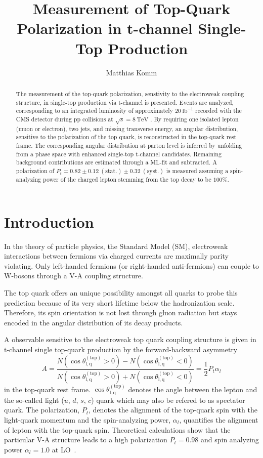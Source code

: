\documentclass[a4paper]{jpconf}
\newcommand{\unit}[1]{\ensuremath{\mathrm{~#1}}}
\newcommand{\particle}[1]{\ensuremath{#1}}
\newcommand{\costheta}[0]{\cos\theta_{\mathrm{l,q}}^{\mathrm{(top)}}}
\begin{document}
\title{Measurement of Top-Quark Polarization in t-channel Single-Top Production}

\author{Matthias Komm}

\address{Centre for Cosmology, Particle Physics and Phenomenology, Universit\'e catholique de Louvain, 1348 Louvain-la-Neuve, Belgium}


\begin{abstract}
The measurement of the top-quark polarization, senstivity to the electroweak coupling structure, in single-top production via t-channel is presented. Events are analyzed, corresponding to an integrated luminosity of approximately $20\unit{fb^{-1}}$ recorded with the CMS detector during pp collisions at $\sqrt{s}=8\unit{TeV}$ . By requiring one isolated lepton (muon or electron), two jets, and missing transverse energy, an angular distribution, sensitive to the  polarization of the top quark, is reconstructed in the top-quark rest frame. The corresponding angular distribution at parton level is inferred by unfolding from a phase space with enhanced single-top t-channel candidates. Remaining background contributions are estimated through a ML-fit and subtracted. A polarization of $P_{t}=0.82\pm0.12\mathrm{~(stat.)}\pm0.32\mathrm{~(syst.)}$ is measured assuming a spin-analyzing power of the charged lepton stemming from the top decay to be $100\%$.
\end{abstract}

\section{Introduction}
In the theory of particle physics, the Standard Model (SM), electroweak interactions between fermions via charged currents are maximally parity violating. Only left-handed fermions (or right-handed anti-fermions) can couple to W-bosons through a V-A coupling structure.


The top quark offers an unique possibility amongst all quarks to probe this prediction because of its very short lifetime below the hadronization scale. Therefore, its spin orientation is not lost through gluon radiation but stays encoded in the angular distribution of its decay products.


A observable sensitive to the electroweak top quark coupling structure is given in t-channel single top-quark production by the forward-backward asymmetry
\begin{equation}
A=\frac{N(\costheta>0)-N(\costheta<0)}{N(\costheta>0)+N(\costheta<0)}=\frac{1}{2}P_{t}\alpha_{l}
\end{equation}
in the top-quark rest frame. $\costheta$ denotes the angle between the lepton and the so-called light ($\particle{u}$, $\particle{d}$, $\particle{s}$, $\particle{c}$) quark which may also be refered to as spectator quark. The polarization, $P_{t}$, denotes the alignment of the top-quark spin with the light-quark momentum and the spin-analyzing power, $\alpha_{l}$, quantifies the alignment of lepton with the top-quark spin. Theoretical calculations show that the particular V-A structure leads to a high polarization $P_{t}=0.98$ and spin analyzing power $\alpha_{l}=1.0$ at LO~\cite{bernreuther}.
\end{document}
